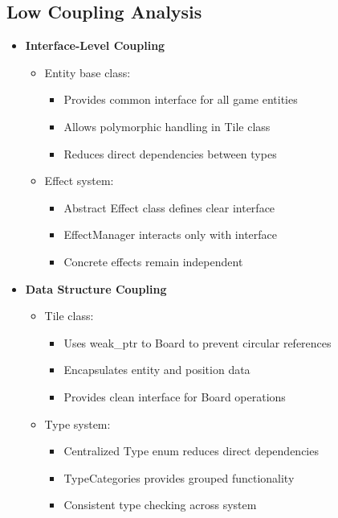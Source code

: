 \documentclass{article}
\begin{document}
\subsection{Low Coupling Analysis}
\begin{itemize}
    \item \textbf{Interface-Level Coupling}
    \begin{itemize}
        \item Entity base class:
        \begin{itemize}
            \item Provides common interface for all game entities
            \item Allows polymorphic handling in Tile class
            \item Reduces direct dependencies between types
        \end{itemize}
        \item Effect system:
        \begin{itemize}
            \item Abstract Effect class defines clear interface
            \item EffectManager interacts only with interface
            \item Concrete effects remain independent
        \end{itemize}
    \end{itemize}

    \item \textbf{Data Structure Coupling}
    \begin{itemize}
        \item Tile class:
        \begin{itemize}
            \item Uses weak\_ptr to Board to prevent circular references
            \item Encapsulates entity and position data
            \item Provides clean interface for Board operations
        \end{itemize}
        \item Type system:
        \begin{itemize}
            \item Centralized Type enum reduces direct dependencies
            \item TypeCategories provides grouped functionality
            \item Consistent type checking across system
        \end{itemize}
    \end{itemize}


\end{itemize}
\end{document}
